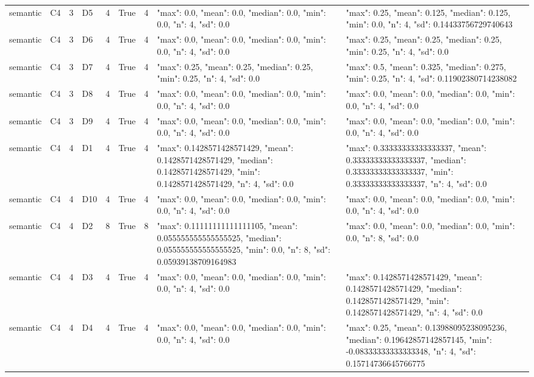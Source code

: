 \begin{tabular}{lllllllll}
semantic & C4 & 3 & D5 & 4 & True & 4 & {"max": 0.0, "mean": 0.0, "median": 0.0, "min": 0.0, "n": 4, "sd": 0.0} & {"max": 0.25, "mean": 0.125, "median": 0.125, "min": 0.0, "n": 4, "sd": 0.14433756729740643} \\
semantic & C4 & 3 & D6 & 4 & True & 4 & {"max": 0.0, "mean": 0.0, "median": 0.0, "min": 0.0, "n": 4, "sd": 0.0} & {"max": 0.25, "mean": 0.25, "median": 0.25, "min": 0.25, "n": 4, "sd": 0.0} \\
semantic & C4 & 3 & D7 & 4 & True & 4 & {"max": 0.25, "mean": 0.25, "median": 0.25, "min": 0.25, "n": 4, "sd": 0.0} & {"max": 0.5, "mean": 0.325, "median": 0.275, "min": 0.25, "n": 4, "sd": 0.11902380714238082} \\
semantic & C4 & 3 & D8 & 4 & True & 4 & {"max": 0.0, "mean": 0.0, "median": 0.0, "min": 0.0, "n": 4, "sd": 0.0} & {"max": 0.0, "mean": 0.0, "median": 0.0, "min": 0.0, "n": 4, "sd": 0.0} \\
semantic & C4 & 3 & D9 & 4 & True & 4 & {"max": 0.0, "mean": 0.0, "median": 0.0, "min": 0.0, "n": 4, "sd": 0.0} & {"max": 0.0, "mean": 0.0, "median": 0.0, "min": 0.0, "n": 4, "sd": 0.0} \\
semantic & C4 & 4 & D1 & 4 & True & 4 & {"max": 0.1428571428571429, "mean": 0.1428571428571429, "median": 0.1428571428571429, "min": 0.1428571428571429, "n": 4, "sd": 0.0} & {"max": 0.33333333333333337, "mean": 0.33333333333333337, "median": 0.33333333333333337, "min": 0.33333333333333337, "n": 4, "sd": 0.0} \\
semantic & C4 & 4 & D10 & 4 & True & 4 & {"max": 0.0, "mean": 0.0, "median": 0.0, "min": 0.0, "n": 4, "sd": 0.0} & {"max": 0.0, "mean": 0.0, "median": 0.0, "min": 0.0, "n": 4, "sd": 0.0} \\
semantic & C4 & 4 & D2 & 8 & True & 8 & {"max": 0.11111111111111105, "mean": 0.055555555555555525, "median": 0.055555555555555525, "min": 0.0, "n": 8, "sd": 0.05939138709164983} & {"max": 0.0, "mean": 0.0, "median": 0.0, "min": 0.0, "n": 8, "sd": 0.0} \\
semantic & C4 & 4 & D3 & 4 & True & 4 & {"max": 0.0, "mean": 0.0, "median": 0.0, "min": 0.0, "n": 4, "sd": 0.0} & {"max": 0.1428571428571429, "mean": 0.1428571428571429, "median": 0.1428571428571429, "min": 0.1428571428571429, "n": 4, "sd": 0.0} \\
semantic & C4 & 4 & D4 & 4 & True & 4 & {"max": 0.0, "mean": 0.0, "median": 0.0, "min": 0.0, "n": 4, "sd": 0.0} & {"max": 0.25, "mean": 0.13988095238095236, "median": 0.19642857142857145, "min": -0.08333333333333348, "n": 4, "sd": 0.15714736645766775} \\

\end{tabular}
